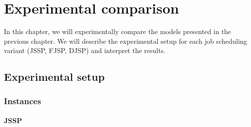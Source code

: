 \chapter{Experimental comparison}

In this chapter, we will experimentally compare the models presented in the previous chapter. We will describe the experimental setup for each job scheduling variant (JSSP, FJSP, DJSP) and interpret the results. 

\section{Experimental setup}

\subsection{Instances}

\subsubsection*{JSSP}

